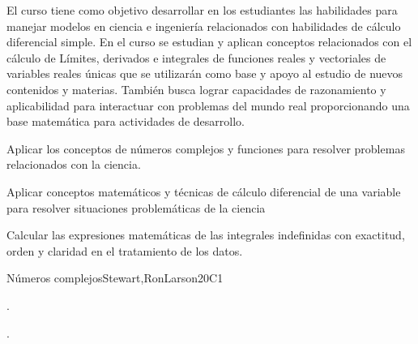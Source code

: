 \begin{syllabus}


\begin{justification}
El curso tiene como objetivo desarrollar en los estudiantes las habilidades para manejar modelos en ciencia e ingeniería relacionados con habilidades de cálculo diferencial simple. En el curso se estudian y aplican conceptos relacionados con el cálculo de Límites, derivados e integrales de funciones reales y vectoriales de variables reales únicas que se utilizarán como base y
apoyo al estudio de nuevos contenidos y materias. También busca lograr capacidades de razonamiento y aplicabilidad para interactuar con problemas del mundo real proporcionando una base matemática para actividades de desarrollo.
\end{justification}

\begin{goals}
\item Aplicar los conceptos de números complejos y funciones para resolver problemas relacionados con la ciencia.
\item Aplicar conceptos matemáticos y técnicas de cálculo diferencial de una variable para resolver situaciones problemáticas de la ciencia
\item Calcular las expresiones matemáticas de las integrales indefinidas con exactitud, orden y claridad en el tratamiento de los datos.

\end{goals}

\begin{outcomes}
    \item {}
    \item {}
\end{outcomes}

\begin{competences}
    \item {}
    \item {}
    \item {}
\end{competences}

\begin{unit}{Números complejos}{}{Stewart,RonLarson}{20}{C1}
   \begin{topics}
    \item . %
    \item . %
   \end{topics}


\end{unit}
\end{syllabus}
